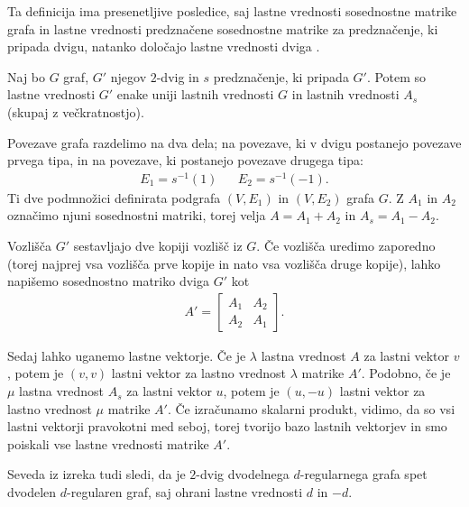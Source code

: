 Ta definicija ima presenetljive posledice, saj lastne vrednosti sosednostne matrike grafa in lastne vrednosti predznačene sosednostne matrike za predznačenje, ki pripada dvigu, natanko določajo lastne vrednosti dviga \cite{bilu2004constructingexpandergraphs2lifts}.
\begin{izrek}
    Naj bo \(G\) graf, \(G'\) njegov \(2\)-dvig in \(s\) predznačenje, ki pripada \(G'\). Potem so lastne vrednosti \(G'\) enake uniji lastnih vrednosti \(G\) in lastnih vrednosti \(A_s\) (skupaj z večkratnostjo).
\end{izrek}
\begin{dokaz}
    Povezave grafa razdelimo na dva dela; na povezave, ki v dvigu postanejo povezave prvega tipa, in na povezave, ki postanejo povezave drugega tipa:
    \begin{align*}
        E_1 = s^{-1}(1) &  & E_2 = s^{-1}(-1).
    \end{align*}
    Ti dve podmnožici definirata podgrafa \((V, E_1)\) in \((V, E_2)\) grafa \(G\). Z \(A_1\) in \(A_2\) označimo njuni sosednostni matriki, torej velja \(A = A_1 + A_2\) in \(A_s = A_1 - A_2\).

    Vozlišča \(G'\) sestavljajo dve kopiji vozlišč iz \(G\). Če vozlišča uredimo zaporedno (torej najprej vsa vozlišča prve kopije in nato vsa vozlišča druge kopije), lahko napišemo sosednostno matriko dviga \(G'\) kot
    \begin{align*}
        A' = \begin{bmatrix}
                 A_1 & A_2 \\
                 A_2 & A_1
             \end{bmatrix}.
    \end{align*}

    Sedaj lahko uganemo lastne vektorje. Če je \(\lambda\) lastna vrednost \(A\) za lastni vektor \(v\), potem je \((v, v)\) lastni vektor za lastno vrednost \(\lambda\) matrike \(A'\). Podobno, če je \(\mu\) lastna vrednost \(A_s\) za lastni vektor \(u\), potem je \((u, -u)\) lastni vektor za lastno vrednost \(\mu\) matrike \(A'\). Če izračunamo skalarni produkt, vidimo, da so vsi lastni vektorji pravokotni med seboj, torej tvorijo bazo lastnih vektorjev in smo poiskali vse lastne vrednosti matrike \(A'\).
\end{dokaz}
Seveda iz izreka tudi sledi, da je \(2\)-dvig dvodelnega \(d\)-regularnega grafa spet dvodelen \(d\)-regularen graf, saj ohrani lastne vrednosti \(d\) in \(-d\).

